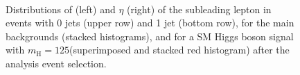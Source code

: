 \begin{figure}
\centering
{}
\\
\caption{Distributions of \pt (left) and $\eta$ (right) of the subleading lepton in events with 0 jets (upper row) and 1 jet (bottom row), for the main backgrounds (stacked histograms), and for a SM Higgs boson signal with $m_\mathrm{H}=125$\GeV (superimposed and stacked red histogram)  after the analysis event selection.}\label{fig:distr2}
\end{figure}

